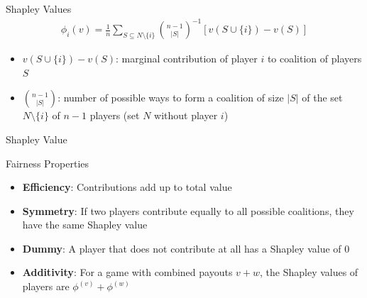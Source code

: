 \documentclass[ignorenonframetext,xcolor=x11names]{beamer}
\begin{document}
\begin{frame}[label=full]{Shapley Values}
\begin{align*}
\phi_i(v) = \frac{1}{n} \sum_{S \subseteq N \setminus \{i\}} \binom{n-1}{|S|}^{-1} \left[ v(S \cup \{i\}) - v(S)\right]
\end{align*}

\begin{itemize}
\item $v(S \cup \{i\}) - v(S)$: marginal contribution of player $i$ to coalition of players $S$
\item $\binom{n-1}{|S|}$: number of possible ways to form a coalition of size $|S|$ of the set $N \setminus \{i\}$ of $n-1$ players (set $N$ without player $i$)
\end{itemize}
\end{frame}

\begin{frame}[label=full]{Shapley Value}
\begin{block}{Fairness Properties}
\begin{itemize}
   \item \textbf{Efficiency}: Contributions add up to total value
   \item \textbf{Symmetry}: If two players contribute equally to all possible coalitions, they have the same Shapley value
   \item \textbf{Dummy}: A player that does not contribute at all has a Shapley value of $0$
   \item \textbf{Additivity}: For a game with combined payouts $v + w$, the Shapley values of players are $\phi^{(v)} + \phi^{(w)}$
\end{itemize}
\end{block}
\end{frame}
\end{document}
